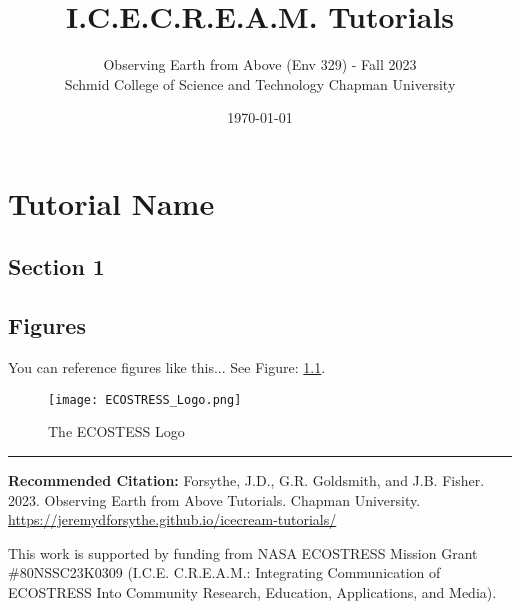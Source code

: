 \documentclass[oneside,a4paper,11pt,explicit]{book}
\title{I.C.E.C.R.E.A.M. Tutorials}
\subtitle{\small Observing Earth from Above (Env 329) - Fall 2023  \\
	\small Schmid College of Science and Technology Chapman University}
\date{\today}
\begin{document}
	
\dominitoc

\setcounter{chapter}{3} %

\chapter{Tutorial Name} %

\vspace{-2em}

\minitoc

\section{Section 1}

\lipsum[1]

\section{Figures}
\lipsum[3] 

\vspace{2em}

You can reference figures like this... See Figure: \ref{fig:ECOSTRESS_Logo}.

\vspace{2em}

\lipsum[5] 

\begin{figure}[h]
    \centering
    \texttt{[image: ECOSTRESS\_Logo.png]}
    \caption{The ECOSTESS Logo}
    \label{fig:ECOSTRESS_Logo}
\end{figure}

\lipsum[2]

\vfill

\hrule

\vspace{2em}

\textbf{Recommended Citation:} Forsythe, J.D., G.R. Goldsmith, and J.B. Fisher. 2023. Observing Earth from Above Tutorials. Chapman University. \url{https://jeremydforsythe.github.io/icecream-tutorials/}

\vspace{1em}

This work is supported by funding from NASA ECOSTRESS Mission Grant \#80NSSC23K0309 (I.C.E. C.R.E.A.M.: Integrating Communication of ECOSTRESS Into Community Research, Education, Applications, and Media).
\end{document}
